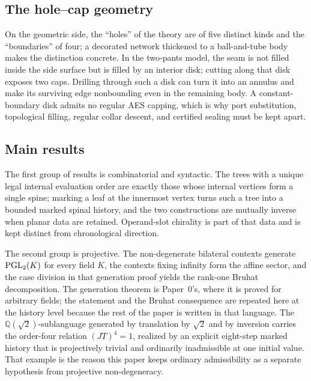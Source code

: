 \subsection{The hole--cap geometry}

On the geometric side, the ``holes'' of the theory are of five distinct kinds and
the ``boundaries'' of four; a decorated network thickened to a ball-and-tube
body makes the distinction concrete.  In the two-pants model, the seam is not
filled inside the side surface but is filled by an interior disk; cutting along
that disk exposes two caps.  Drilling through such a disk can turn it into an
annulus and make its surviving edge nonbounding even in the remaining body.
A constant-boundary disk admits no regular AES capping, which is why
port substitution, topological filling, regular collar descent, and certified
sealing must be kept apart.

\subsection{Main results}

The first group of results is combinatorial and syntactic.  The trees with a
unique legal internal evaluation order are exactly those whose internal vertices
form a single spine; marking a leaf at the innermost vertex turns such a tree into
a bounded marked spinal history, and the two constructions are mutually inverse
when planar data are retained.  Operand-slot chirality is part of that data and is
kept distinct from chronological direction.

The second group is projective.  The non-degenerate bilateral contexts generate
$\operatorname{PGL}_2(K)$ for every field $K$, the contexts fixing infinity form the affine
sector, and the case division in that generation proof yields the rank-one Bruhat
decomposition.  The generation theorem is Paper~0's, where it is proved for
arbitrary fields; the statement and the Bruhat consequence are repeated here at
the history level because the rest of the paper is written in that language.  The
$\mathbb Q(\sqrt2)$-sublanguage generated by translation by $\sqrt2$ and by
inversion carries the order-four relation $(JT)^4=1$, realized by an explicit
eight-step marked history that is projectively trivial and ordinarily inadmissible
at one initial value.  That example is the reason this paper keeps ordinary
admissibility as a separate hypothesis from projective non-degeneracy.

